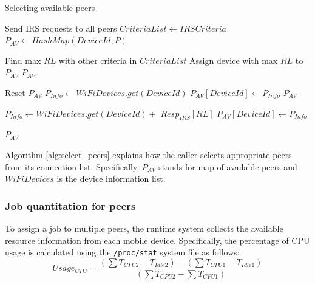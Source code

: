 \documentclass{sig-alternate}[10pt]
\begin{document}
\begin{algorithm}

\caption{Selecting available peers}
\label{alg:select_peers}
\begin{algorithmic}[1] 
\begin{scriptsize}
\State Send IRS requests to all peers 
\State $CriteriaList \leftarrow IRSCriteria$
\State $P_{AV} \leftarrow HashMap(DeviceId, P)$

  	\State Find max $RL$ with other criteria in $CriteriaList$
		\State Assign device with max $RL$ to $P_{AV}$
  	\State \Return $P_{AV}$
  \EndFor
\EndIf

  	\State Reset $P_{AV}$ 
  	\State $P_{Info} \leftarrow WiFiDevices.get(DeviceId)$
  	\State $P_{AV}[DeviceId] \leftarrow P_{Info}$
  	\State \Return $P_{AV}$
  \EndIf

  	\State $P_{Info} \leftarrow WiFiDevices.get(DeviceId) + $
		\State
			\hspace{\algorithmicindent}
			\hspace{\algorithmicindent}
			\hspace{\algorithmicindent}
			\hspace{\algorithmicindent}
			$Resp_{IRS}[RL]$
  	\State $P_{AV}[DeviceId] \leftarrow P_{Info}$
  \EndIf
\EndFor

\State \Return $P_{AV}$
\EndFunction
\end{scriptsize}
\end{algorithmic}

\end{algorithm}

Algorithm \ref{alg:select_peers} explains how the caller selects appropriate peers from its connection list. Specifically, $P_{AV}$ stands for map of available peers and $WiFiDevices$ is the device information list.\\

\subsubsection{Job quantitation for peers}\label{ss_jqfp}
To assign a job to multiple peers, the runtime system collects the available resource information from each mobile device. Specifically, the percentage of CPU usage is calculated using the \texttt{/proc/stat} system file as follows:
\begin{equation}
\label{eq:cpu_usage}
Usage_{CPU} = \frac{(\sum{T_{CPU2}} - T_{Idle2}) - (\sum{T_{CPU1}} - T_{Idle1})}{(\sum{T_{CPU2}} - \sum{T_{CPU1}})}
\end{equation}
\end{document}
